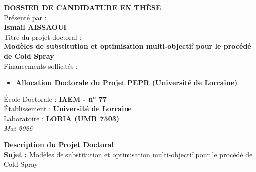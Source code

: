 \documentclass[a4paper,11pt]{article}
\begin{document}
\begin{titlepage}
    \begin{center}
        \vspace*{2cm}
        {\Huge\bfseries\color{loriagold} DOSSIER DE CANDIDATURE EN THÈSE}\\[2cm]
        
        {\Large Présenté par :}\\[0.5cm]
        {\huge\bfseries Ismail AISSAOUI}\\[2cm]
        
        {\Large Titre du projet doctoral :}\\[0.5cm]
        {\Large\bfseries Modèles de substitution et optimisation multi-objectif pour le procédé de Cold Spray}\\[2cm]
        
        {\Large Financements sollicités :}\\[0.5cm]
        \begin{itemize}[label=--]
            \item[] \textbf{Allocation Doctorale du Projet PEPR (Université de Lorraine)}
        \end{itemize}

        \vfill
        
        {\Large École Doctorale : \textbf{IAEM - n° 77}}\\[0.3cm]
        {\Large Établissement : \textbf{Université de Lorraine}}\\[0.3cm]
        {\Large Laboratoire : \textbf{LORIA (UMR 7503)}}\\[2cm]
        
        \textit{Mai 2026}
    \end{center}
\end{titlepage}

\newpage

\begin{center}
    {\Large\bfseries Description du Projet Doctoral}\\[10pt]
    \textbf{Sujet :} Modèles de substitution et optimisation multi-objectif pour le procédé de Cold Spray
\end{center}
\end{document}
